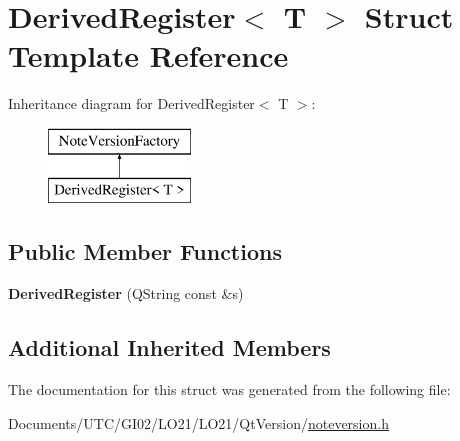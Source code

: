\hypertarget{struct_derived_register}{}\section{Derived\+Register$<$ T $>$ Struct Template Reference}
\label{struct_derived_register}
Inheritance diagram for Derived\+Register$<$ T $>$\+:\begin{figure}[H]
\begin{center}
\leavevmode
\includegraphics[height=2.000000cm]{struct_derived_register}
\end{center}
\end{figure}
\subsection*{Public Member Functions}
\begin{DoxyCompactItemize}
\item 
\mbox{\label{struct_derived_register_af89892a9b8487f33b8824b662d2a6f4a}} 
{\bfseries Derived\+Register} (Q\+String const \&s)
\end{DoxyCompactItemize}
\subsection*{Additional Inherited Members}


The documentation for this struct was generated from the following file\+:\begin{DoxyCompactItemize}
\item 
Documents/\+U\+T\+C/\+G\+I02/\+L\+O21/\+L\+O21/\+Qt\+Version/\hyperlink{noteversion_8h}{noteversion.\+h}\end{DoxyCompactItemize}
